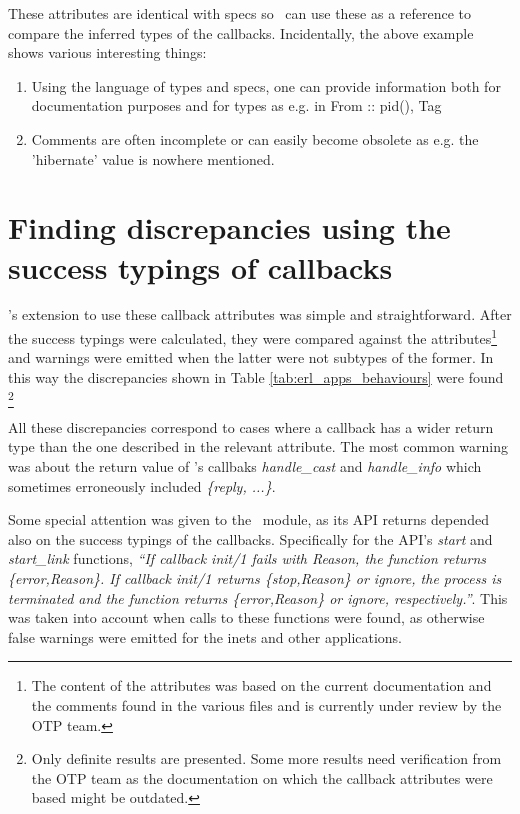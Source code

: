 These attributes are identical with specs so \dr\ can use these as a
reference to compare the inferred types of the callbacks.
Incidentally, the above example shows various interesting things:

\begin{enumerate}
\item Using the language of types and specs, one can provide
  information both for documentation purposes and for types as e.g. in
  From :: {pid(), Tag}
\item Comments are often incomplete or can easily become obsolete as
  e.g. the 'hibernate' value is nowhere mentioned.
\end{enumerate}

\section{Finding discrepancies using the success typings of callbacks}
\label{sct:behaviour_discrepancies}

\dr's extension to use these callback attributes was simple and
straightforward. After the success typings were calculated, they were
compared against the attributes\footnote{The content of the attributes
  was based on the current documentation and the comments found in the
  various files and is currently under review by the OTP team.} and
warnings were emitted when the latter were not subtypes of the
former. In this way the discrepancies shown in Table
\ref{tab:erl_apps_behaviours} were found \footnote{Only definite
  results are presented. Some more results need verification from the
  OTP team as the documentation on which the callback attributes were
  based might be outdated.}



All these discrepancies correspond to cases where a callback has a
wider return type than the one described in the relevant
attribute. The most common warning was about the return value of
\genserv's callbaks \emph{handle\_cast} and \emph{handle\_info} which
sometimes erroneously included \emph{\{reply, ...\}}.

Some special attention was given to the \genserv\ module, as
its API returns depended also on the success typings of the
callbacks. Specifically for the API's \emph{start} and
\emph{start\_link} functions, \emph{``If callback init/1 fails with
  Reason, the function returns \{error,Reason\}. If callback init/1
  returns \{stop,Reason\} or ignore, the process is terminated and the
  function returns \{error,Reason\} or ignore, respectively.''}. This
was taken into account when calls to these functions were found, as
otherwise false warnings were emitted for the inets and other
applications.


